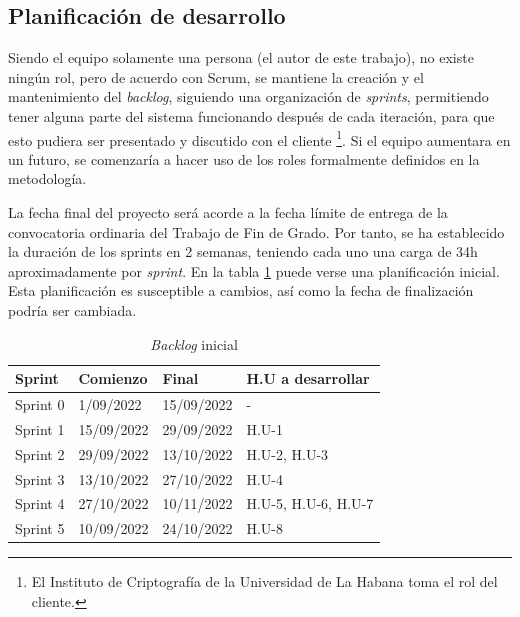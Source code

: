 \subsection{Planificación de desarrollo}
Siendo el equipo solamente una persona (el autor de este trabajo), no existe ningún rol, pero de acuerdo con Scrum, se mantiene la creación y el mantenimiento del \textit{backlog}, siguiendo una organización de \textit{sprints}, permitiendo tener alguna parte del sistema funcionando después de cada iteración, para que esto pudiera ser presentado y discutido con el cliente \footnote{El Instituto de Criptografía de la Universidad de La Habana toma el rol del cliente.}. Si el equipo aumentara en un futuro, se comenzaría a hacer uso de los roles formalmente definidos en la metodología.

La fecha final del proyecto será acorde a la fecha límite de entrega de la convocatoria ordinaria del Trabajo de Fin de Grado. Por tanto, se ha establecido la duración de los sprints en 2 semanas, teniendo cada uno una carga de 34h aproximadamente por \textit{sprint}. En la tabla \ref{tab:sprints} puede verse una planificación inicial. Esta planificación es susceptible a cambios, así como la fecha de finalización podría ser cambiada.


\begin{table}[!h]
	\begin{center}
		\begin{tabular}{|p{2cm}|p{3cm}|p{3cm}|p{3.8cm}|}
		\hline \textbf{Sprint} & \textbf{Comienzo} & \textbf{Final} & \textbf{H.U a desarrollar} \\ 
		\hline Sprint 0 & 1/09/2022  & 15/09/2022 & -\\ 
		\hline Sprint 1 & 15/09/2022 & 29/09/2022 & H.U-1\\ 
		\hline Sprint 2 & 29/09/2022 & 13/10/2022 & H.U-2, H.U-3\\ 
		\hline Sprint 3 & 13/10/2022 & 27/10/2022 & H.U-4\\ 
		\hline Sprint 4 & 27/10/2022 & 10/11/2022 & H.U-5, H.U-6, H.U-7\\ 
		\hline Sprint 5 & 10/09/2022 & 24/10/2022 & H.U-8\\ 
		\hline 
		\end{tabular}
		\caption{\textit{Backlog} inicial}
		\label{tab:sprints}
	\end{center}
\end{table}

